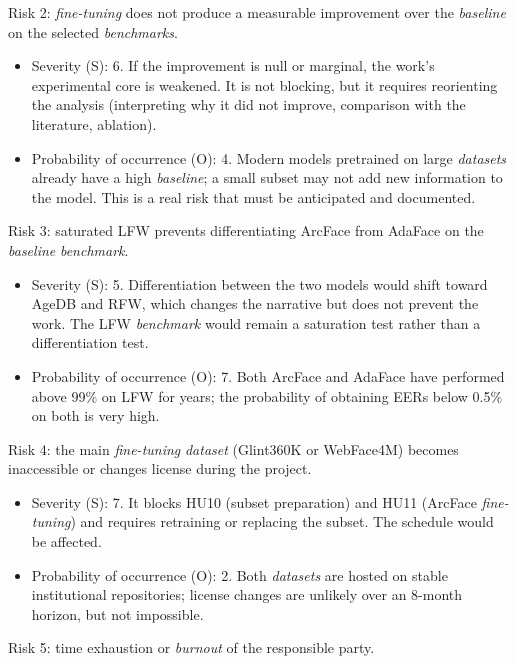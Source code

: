 \documentclass[
  11pt, %
]{charter}
\begin{document}
Risk 2: \textit{fine-tuning} does not produce a measurable improvement over the \textit{baseline} on the selected \textit{benchmarks}.

\begin{itemize}
\item Severity (S): 6. If the improvement is null or marginal, the work's experimental core is weakened. It is not blocking, but it requires reorienting the analysis (interpreting why it did not improve, comparison with the literature, ablation).
\item Probability of occurrence (O): 4. Modern models pretrained on large \textit{datasets} already have a high \textit{baseline}; a small subset may not add new information to the model. This is a real risk that must be anticipated and documented.
\end{itemize}

Risk 3: saturated LFW prevents differentiating ArcFace from AdaFace on the \textit{baseline} \textit{benchmark}.

\begin{itemize}
\item Severity (S): 5. Differentiation between the two models would shift toward AgeDB and RFW, which changes the narrative but does not prevent the work. The LFW \textit{benchmark} would remain a saturation test rather than a differentiation test.
\item Probability of occurrence (O): 7. Both ArcFace and AdaFace have performed above 99\% on LFW for years; the probability of obtaining EERs below 0.5\% on both is very high.
\end{itemize}

Risk 4: the main \textit{fine-tuning} \textit{dataset} (Glint360K or WebFace4M) becomes inaccessible or changes license during the project.

\begin{itemize}
\item Severity (S): 7. It blocks HU10 (subset preparation) and HU11 (ArcFace \textit{fine-tuning}) and requires retraining or replacing the subset. The schedule would be affected.
\item Probability of occurrence (O): 2. Both \textit{datasets} are hosted on stable institutional repositories; license changes are unlikely over an 8-month horizon, but not impossible.
\end{itemize}

Risk 5: time exhaustion or \textit{burnout} of the responsible party.
\end{document}
